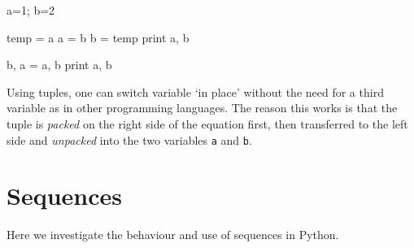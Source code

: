 \documentclass[draft=false]{article}
\newcommand{\answer}[1]{#1}%
\def\pythoni{\lstinline[language=pythontim]}
\begin{document}
\begin{multicols}{2}
\begin{python}
a=1; b=2

temp = a
a = b
b = temp
print a, b

b, a = a, b
print a, b
\end{python}

\answer{Using tuples, one can switch variable `in place' without the need for a third variable as in other programming languages. The reason this works is that the tuple is \emph{packed} on the right side of the equation first, then transferred to the left side and \emph{unpacked} into the two variables \pythoni{a} and \pythoni{b}.}

\end{multicols}

\pagebreak

\section{Sequences}

Here we investigate the behaviour and use of sequences in Python.
\end{document}
